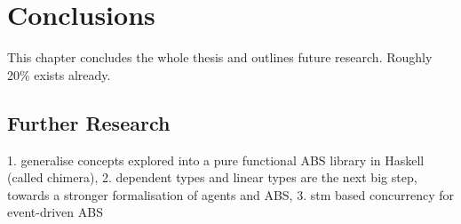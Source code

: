 \chapter{Conclusions}
\label{ch:conclusions}

This chapter concludes the whole thesis and outlines future research. Roughly 20\% exists already.


\section{Further Research}
1. generalise concepts explored into a pure functional ABS library in Haskell (called chimera),
2. dependent types and linear types are the next big step, towards a stronger formalisation of agents and ABS,
3. stm based concurrency for event-driven ABS 